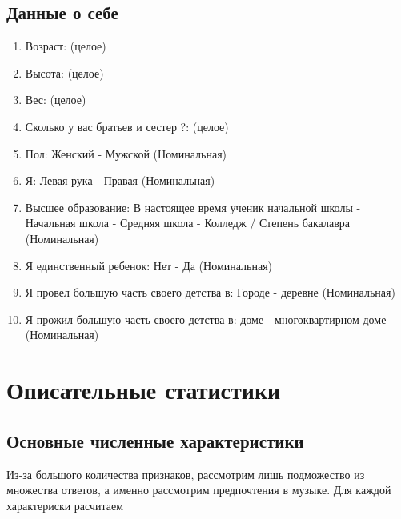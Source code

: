 \documentclass[11pt]{article}
\begin{document}
\subsection{Данные о себе}
\begin{enumerate}
\item Возраст: (целое)
\item Высота: (целое)
\item Вес: (целое)
\item Сколько у вас братьев и сестер ?: (целое)
\item Пол: Женский - Мужской (Номинальная)
\item Я: Левая рука - Правая (Номинальная)
\item Высшее образование: В настоящее время ученик начальной школы - Начальная школа - Средняя школа - Колледж / Степень бакалавра (Номинальная)
\item Я единственный ребенок: Нет - Да (Номинальная)
\item Я провел большую часть своего детства в: Городе -  деревне (Номинальная)
\item Я прожил большую часть своего детства в: доме  - многоквартирном доме (Номинальная)
\end{enumerate}
\pagebreak

\section{Описательные статистики}
\subsection{Основные численные характеристики}
Из-за большого количества признаков, рассмотрим лишь подможество из множества ответов, а именно рассмотрим
предпочтения в музыке. Для каждой характериски расчитаем 
\end{document}
